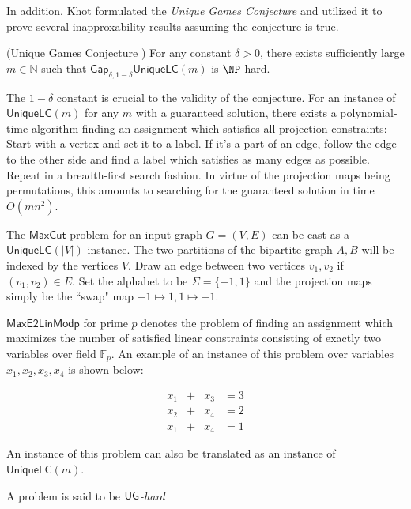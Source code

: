 In addition, Khot formulated the \emph{Unique Games Conjecture} and utilized it to prove several inapproxability results assuming the conjecture is true.

\begin{conjecture} (Unique Games Conjecture \cite{khot2002power})
  For any constant $\delta > 0$, there exists sufficiently large $m \in \mathbb{N}$ such that $\mathsf{Gap}_{\delta,1-\delta}\mathsf{UniqueLC}(m)$ is $\NP$-hard.
\end{conjecture}

\begin{remark}
  The $1-\delta$ constant is crucial to the validity of the conjecture. For an instance of $\mathsf{UniqueLC}(m)$ for any $m$ with a guaranteed solution, there exists a polynomial-time algorithm finding an assignment which satisfies all projection constraints: Start with a vertex and set it to a label. If it's a part of an edge, follow the edge to the other side and find a label which satisfies as many edges as possible. Repeat in a breadth-first search fashion. In virtue of the projection maps being permutations, this amounts to searching for the guaranteed solution in time $O(mn^2)$.
\end{remark}

\begin{example}
  The $\mathsf{MaxCut}$ problem for an input graph $G = (V,E)$ can be cast as a $\mathsf{UniqueLC}(|V|)$ instance. The two partitions of the bipartite graph $A,B$ will be indexed by the vertices $V$. Draw an edge between two vertices $v_1,v_2$ if $(v_1,v_2) \in E$. Set the alphabet to be $\Sigma =\{-1,1\}$ and the projection maps simply be the ``swap" map $-1 \mapsto 1, 1 \mapsto -1$.
\end{example}

\begin{example}
  $\mathsf{MaxE2LinModp}$ for prime $p$ denotes the problem of finding an assignment which maximizes the number of satisfied linear constraints consisting of exactly two variables over field $\mathbb{F}_p$. An example of an instance of this problem over variables $x_1,x_2,x_3,x_4$ is shown below:

  \begin{equation*}
    \begin{alignedat}{3}
      x_1 & +{} & x_3 & = 3 \\
      x_2 & +{}  & x_4 & = 2 \\
      x_1 & +{} & x_4 & = 1
    \end{alignedat}
  \end{equation*}

  An instance of this problem can also be translated as an instance of $\mathsf{UniqueLC}(m)$.
\end{example}

\begin{definition}
  A problem is said to be \emph{$\mathsf{UG}$-hard}
\end{definition}

